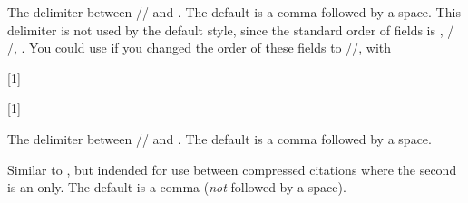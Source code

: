 \documentclass[DIV=9]{scrartcl}
\newcommand*{\highlight}[2][1]{\textcolor{highlight#1}{#2}}
\begin{document}
\begin{ltxsyntax}
The delimiter between \slash{}\slash
{} and .
The default is a comma followed by a space.
This delimiter is not used by the default style, since the standard order of
fields is , \slash
{}\slash{}, .
You could use  if you changed the order of these fields to
\slash{}\slash{},
  with
\begin{biblatexcode}
[1]{%
  \newunit}
\end{biblatexcode}
\begin{bibexample}
\renewcommand*{\publocdelim}{\highlight[1]{\bfseries\addcomma\textvisiblespace}}
\renewcommand*{\locdatedelim}{\highlight[2]{\bfseries\addcomma\textvisiblespace}}
[1]{%
  \setunit*{\publocdelim}%
  \setunit*{\locdatedelim}%
  \newunit}
\makeatletter\bbx@opt@mergedate@false\makeatother
{}
\end{bibexample}


The delimiter between \slash{}\slash
{} and .
The default is a comma followed by a space.
\begin{bibexample}
\renewcommand*{\pubdatedelim}{\highlight{\bfseries\addcomma\textvisiblespace}}
\makeatletter\bbx@opt@mergedate@false\makeatother
{}
\end{bibexample}

Similar to , but indended for use between compressed
citations where the second is an  only.
The default is a comma (\emph{not} followed by a space).
\end{ltxsyntax}
\begin{bibexample}
\renewcommand*{\extradateonlycompcitedelim}{\highlight{\bfseries\addcomma}}
\cite{knuth:ct:b,knuth:ct:c}
\end{bibexample}
\end{document}
